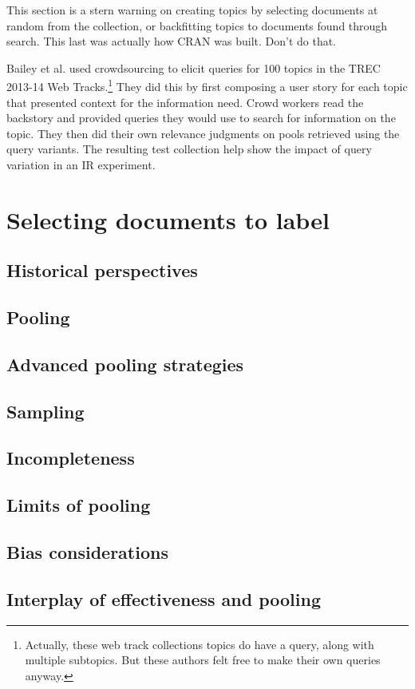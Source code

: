 \documentclass[nobib]{tufte-book}
\begin{document}
This section is a stern warning on creating topics by selecting documents at random from the collection, or backfitting topics to documents found through search.  This last was actually how CRAN was built.  Don't do that.

Bailey et al. used crowdsourcing to elicit queries for 100 topics in the TREC 2013-14 Web Tracks.\footnote{Actually, these web track collections topics do have a query, along with multiple subtopics. But these authors felt free to make their own queries anyway.}  They did this by first composing a user story for each topic that presented context for the information need.  Crowd workers read the backstory and provided queries they would use to search for information on the topic.  They then did their own relevance judgments on pools retrieved using the query variants.  The resulting test collection help show the impact of query variation in an IR experiment.\autocite{bailey-user-variability}\autocite{bailey-uqv-100}

\chapter{Selecting documents to label}

\section{Historical perspectives}
\section{Pooling}
\section{Advanced pooling strategies}
\section{Sampling}
\section{Incompleteness}
\section{Limits of pooling}
\section{Bias considerations}
\section{Interplay of effectiveness and pooling}
\end{document}
